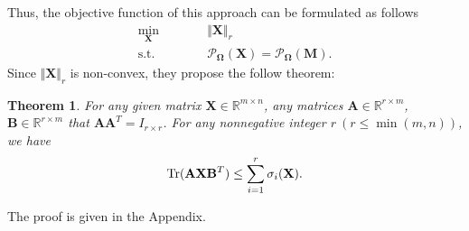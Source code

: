 \documentclass{article}
\newtheorem{theorem}{Theorem}[section]
\begin{document}
{Thus, the objective function of this approach can be formulated as follows
\begin{equation}
    \begin{aligned}
        \min_{\mathbf X}\qquad&\quad \Vert\mathbf X \Vert_r \\
        \text{s.t.}\qquad&\quad  \mathcal{P}_{\mathbf\Omega}(\mathbf X) =  \mathcal{P}_{\mathbf\Omega}(\mathbf M).
    \end{aligned}\label{obj0}
\end{equation}
Since $\Vert\mathbf X \Vert_r$ is non-convex, they propose the follow theorem\cite{von1937some}:
\begin{theorem}
    For any given matrix $\mathbf X \in \mathbb{R}^{m \times n}$, any matrices $\mathbf A \in \mathbb{R}^{r \times m}$, $\mathbf B \in \mathbb{R}^{r \times m}$ that $\mathbf A\mathbf A^T = I_{r \times r}$. For any nonnegative integer $r \ (r \leq \min(m,n))$, we have 
    \begin{equation}
        \text{\rm Tr}(\mathbf A\mathbf X\mathbf B^T) \leq \sum_{i=1}^r \sigma_i(\mathbf X).
        \label{eq31}
    \end{equation}
    \label{thm31}
\end{theorem}
The proof is given in the Appendix.

}
\end{document}
